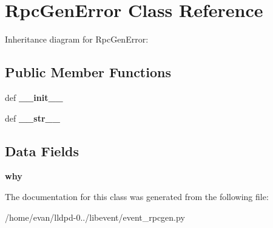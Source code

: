\section{\-Rpc\-Gen\-Error \-Class \-Reference}
\label{classevent__rpcgen_1_1_rpc_gen_error}


\-Inheritance diagram for \-Rpc\-Gen\-Error\-:
\subsection*{\-Public \-Member \-Functions}
\begin{DoxyCompactItemize}
\item 
def {\bfseries \-\_\-\-\_\-init\-\_\-\-\_\-}\label{classevent__rpcgen_1_1_rpc_gen_error_ac775ee34451fdfa742b318538164070e}

\item 
def {\bfseries \-\_\-\-\_\-str\-\_\-\-\_\-}\label{classevent__rpcgen_1_1_rpc_gen_error_aa7a4b9bc0941308e362738503137460e}

\end{DoxyCompactItemize}
\subsection*{\-Data \-Fields}
\begin{DoxyCompactItemize}
\item 
{\bfseries why}\label{classevent__rpcgen_1_1_rpc_gen_error_a5bea26c31e29a000d5072279d44fdd01}

\end{DoxyCompactItemize}


\-The documentation for this class was generated from the following file\-:\begin{DoxyCompactItemize}
\item 
/home/evan/lldpd-\/0../libevent/event\-\_\-rpcgen.\-py\end{DoxyCompactItemize}
